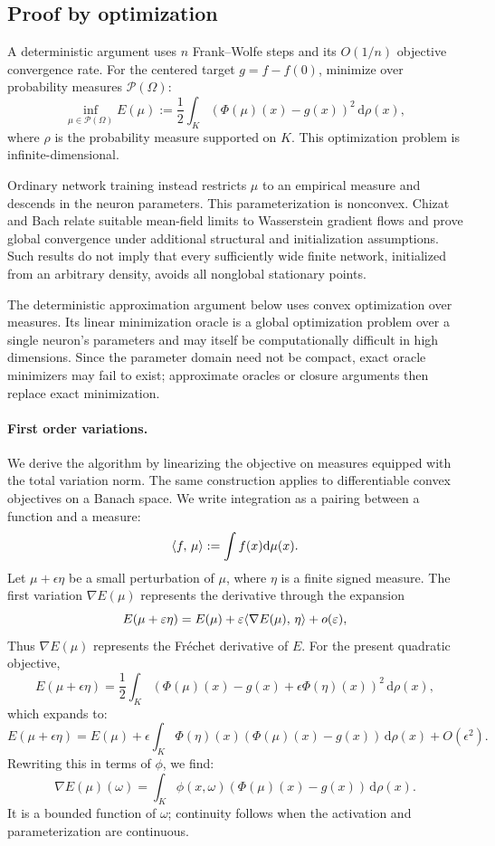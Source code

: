 \subsection{Proof by optimization}

A deterministic argument uses $n$ Frank--Wolfe steps and its $O(1/n)$ objective convergence rate.
%
For the centered target $g=f-f(0)$, minimize over probability measures $\mathcal{P}(\Omega)$:
\begin{equation}\label{eq:mlp-optim-convex}
	\inf_{\mu \in \mathcal{P}(\Omega)} E(\mu) := \frac{1}{2} \int_K \left( \Phi(\mu)(x) - g(x) \right)^2 \, \mathrm{d}\rho(x),
\end{equation}
where $\rho$ is the probability measure supported on $K$. This optimization problem is infinite-dimensional.

Ordinary network training instead restricts $\mu$ to an empirical measure and descends in the neuron parameters. This parameterization is nonconvex. Chizat and Bach relate suitable mean-field limits to Wasserstein gradient flows and prove global convergence under additional structural and initialization assumptions. Such results do not imply that every sufficiently wide finite network, initialized from an arbitrary density, avoids all nonglobal stationary points.

The deterministic approximation argument below uses convex optimization over measures. Its linear minimization oracle is a global optimization problem over a single neuron's parameters and may itself be computationally difficult in high dimensions. Since the parameter domain need not be compact, exact oracle minimizers may fail to exist; approximate oracles or closure arguments then replace exact minimization.

\paragraph{First order variations.}

We derive the algorithm by linearizing the objective on measures equipped with the total variation norm. The same construction applies to differentiable convex objectives on a Banach space.
%
We write integration as a pairing between a function and a measure:
$$
	\langle f,\,\mu\rangle := \int f(x) \mathrm{d} \mu(x).
$$
Let $\mu+\epsilon\eta$ be a small perturbation of $\mu$, where $\eta$ is a finite signed measure.
%
The first variation $\nabla E(\mu)$ represents the derivative through the expansion
\[
	E(\mu+\varepsilon\eta) = E(\mu) + \varepsilon \langle \nabla E(\mu),\,\eta\rangle + o(\varepsilon),
\]
Thus $\nabla E(\mu)$ represents the Fréchet derivative of $E$. For the present quadratic objective,
\[
	E(\mu+\epsilon\eta) = \frac{1}{2} \int_K \left( \Phi(\mu)(x) - g(x) + \epsilon \Phi(\eta)(x) \right)^2 \, \mathrm{d}\rho(x),
\]
which expands to:
\[
	E(\mu+\epsilon\eta) = E(\mu) + \epsilon \int_K \Phi(\eta)(x) \left( \Phi(\mu)(x) - g(x) \right) \, \mathrm{d}\rho(x) + O(\epsilon^2).
\]
Rewriting this in terms of $\phi$, we find:
\[
	\nabla E(\mu)(\omega) = \int_K \phi(x, \omega) \left( \Phi(\mu)(x) - g(x) \right) \, \mathrm{d}\rho(x).
\]
It is a bounded function of $\omega$; continuity follows when the activation and parameterization are continuous.

